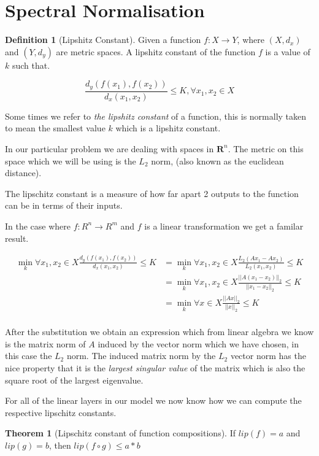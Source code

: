 \documentclass[12pt, a4paper]{report}
\theoremstyle{definition}
\newtheorem{definition}{Definition}[section]
\newtheorem{theorem}{Theorem}
\begin{document}
\section{Spectral Normalisation}

\begin{definition}[Lipshitz Constant]
    Given a function $f: X \rightarrow Y$, where $(X, d_x)$ and $(Y, d_y)$ are metric spaces. A lipshitz constant of the function $f$ is a value of $k$ such that.

    $$\frac{d_y(f(x_1), f(x_2))}{d_x(x_1, x_2)} \leq K, \forall x_1, x_2 \in X $$
\end{definition}

Some times we refer to \textit{the lipshitz constant} of a function, this is normally taken to mean the smallest value $k$ which is a lipshitz constant.

In our particular problem we are dealing with spaces in $\mathbf{R}^n$. The metric on this space which we will be using is the $L_2$ norm, (also known as the euclidean distance).

The lipschitz constant is a measure of how far apart 2 outputs to the function can be in terms of their inputs.

In the case where $f: R^n \rightarrow R^m$ and $f$ is a linear transformation we get a familar result.

\begin{align*}
    \min_k  \forall x_1,x_2 \in X \frac{d_y(f(x_1), f(x_2))}{d_x(x_1, x_2)} \leq K &= \min_k \forall x_1,x_2 \in X \frac{ L_2(Ax_1 - Ax_2)  }{ L_2(x_1, x_2)} \leq K \\
    &=  \min_k \forall x_1,x_2 \in X  \frac{ ||A(x_1 - x_2)||_2  }{ ||x_1- x_2||_2 } \leq K \\
    &=  \min_k \forall x \in X  \frac{ ||Ax||_2  }{ ||x||_2 } \leq K \\
\end{align*}

After the substitution we obtain an expression which from linear algebra we know is the matrix norm of $A$ induced by the vector norm which we have chosen, in this case the $L_2$ norm. The induced matrix norm by the $L_2$ vector norm has the nice property that it is the \textit{largest singular value} of the matrix which is also the square root of the largest eigenvalue.

For all of the linear layers in our model we now know how we can compute the respective lipschitz constants.

\begin{theorem}[Lipschitz constant of function compositions]
    If $lip(f) = a$ and $lip(g) = b$, then $lip(f \circ g) \leq a * b$
\end{theorem}
\end{document}
